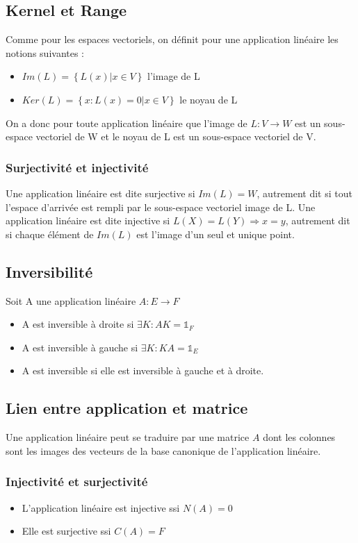 \documentclass[a4paper]{book}
\begin{document}
\subsection{Kernel et Range}
Comme pour les espaces vectoriels, on définit pour une application linéaire les notions suivantes : 
\begin{itemize}
    \item $Im(L) = \left\{ L(x) \left| \right. x \in V \right\}$ l'image de L
    \item $Ker(L) = \left\{ x : L(x) = 0 \left| \right. x \in V \right\}$ le noyau de L
\end{itemize}
On a donc pour toute application linéaire que l'image de $L : V\rightarrow W$ est un sous-espace vectoriel de W et le noyau de L est un sous-espace vectoriel de V.
\subsubsection{Surjectivité et injectivité}
Une application linéaire est dite surjective si $Im(L) = W$, autrement dit si tout l'espace d'arrivée est rempli par le sous-espace vectoriel image de L.
\newline \indent Une application linéaire est dite injective si $L(X) = L(Y) \Rightarrow x = y$, autrement dit si chaque élément de $Im(L)$ est l'image d'un seul et unique point.
\subsection{Inversibilité}
Soit A une application linéaire $A : E \rightarrow F$
\begin{itemize}
    \item A est inversible à droite si $\exists K : AK = \mathbb{1}_F$
    \item A est inversible à gauche si $\exists K : KA = \mathbb{1}_E$
    \item A est inversible si elle est inversible à gauche et à droite.
\end{itemize}
\subsection{Lien entre application et matrice}
Une application linéaire peut se traduire par une matrice $A$ dont les colonnes sont les images des vecteurs de la base canonique de l'application linéaire.
\subsubsection{Injectivité et surjectivité}
\begin{itemize}
    \item L'application linéaire est injective ssi $N(A) = 0$
    \item Elle est surjective ssi $C(A) = F$
\end{itemize}
\end{document}
